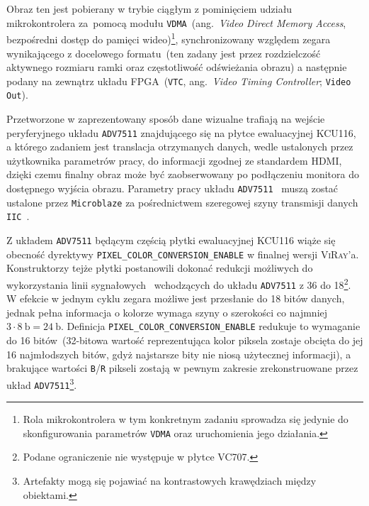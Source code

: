 Obraz ten jest pobierany w trybie ciągłym z pominięciem udziału mikrokontrolera za~pomocą modułu \texttt{VDMA}~(ang.~\textit{Video Direct Memory Access}, bezpośredni dostęp do pamięci wideo)\footnote{Rola mikrokontrolera w tym konkretnym zadaniu sprowadza się jedynie do skonfigurowania parametrów \texttt{VDMA} oraz uruchomienia jego działania.}, synchronizowany względem zegara wynikającego z docelowego formatu~(ten zadany jest przez rozdzielczość aktywnego rozmiaru ramki oraz częstotliwość odświeżania obrazu) a następnie podany na zewnątrz układu FPGA~(\texttt{VTC}, ang.~\textit{Video Timing Controller}; \texttt{Video Out}).

Przetworzone w zaprezentowany sposób dane wizualne trafiają na wejście peryferyjnego układu \texttt{ADV7511} znajdującego się na płytce ewaluacyjnej KCU116, a którego zadaniem jest translacja otrzymanych danych, wedle ustalonych przez użytkownika parametrów pracy, do informacji zgodnej ze standardem HDMI, dzięki czemu finalny obraz może być zaobserwowany po podłączeniu monitora do dostępnego wyjścia obrazu. Parametry pracy układu \texttt{ADV7511}~\cite{ADV7511} muszą zostać ustalone przez \texttt{Microblaze} za pośrednictwem szeregowej szyny transmisji danych \texttt{IIC}~\cite{IIC}.

Z układem \texttt{ADV7511} będącym częścią płytki ewaluacyjnej KCU116 wiąże się obecność dyrektywy \texttt{PIXEL\_COLOR\_CONVERSION\_ENABLE} w finalnej wersji \textsc{ViRay}'a. Konstruktorzy tejże płytki postanowili dokonać redukcji możliwych do wykorzystania linii sygnałowych~\cite{KCU116_UG} wchodzących do układu \texttt{ADV7511} z 36 do 18\footnote{Podane ograniczenie nie występuje w płytce VC707.}. W efekcie w jednym cyklu zegara możliwe jest przesłanie do 18 bitów danych, jednak pełna informacja o kolorze wymaga szyny o szerokości co najmniej $3\cdot 8~\mathrm{b}=24~\mathrm{b}$. Definicja \texttt{PIXEL\_COLOR\_CONVERSION\_ENABLE} redukuje to wymaganie do 16 bitów~(32-bitowa wartość reprezentująca kolor piksela zostaje obcięta do jej 16 najmłodszych bitów, gdyż najstarsze bity nie niosą użytecznej informacji), a brakujące wartości \texttt{B}/\texttt{R} pikseli zostają w pewnym zakresie zrekonstruowane przez układ \texttt{ADV7511}\footnote{Artefakty mogą się pojawiać na kontrastowych krawędziach między obiektami.}.


\begin{landscape}
\end{landscape}

